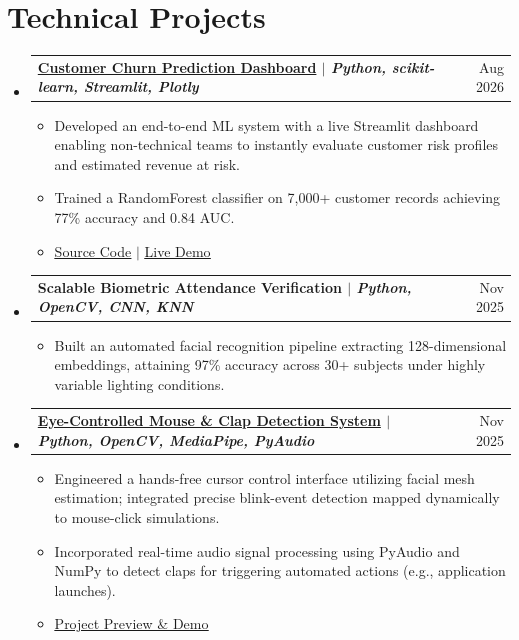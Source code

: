 \documentclass[10pt, a4paper]{article}
\makeatletter
\newcommand{\resumeItem}[1]{\item\small{#1}}
\newcommand{\resumeProjectHeading}[2]{
    \item
    \begin{tabular*}{0.97\textwidth}{l@{\extracolsep{\fill}}r}
      \small\textbf{#1} & #2 \\
    \end{tabular*}\vspace{-5pt}
}
\makeatother
\begin{document}
\section{Technical Projects}
    \begin{itemize}[leftmargin=0.15in, label={}]
      \resumeProjectHeading
          {\textbf{\href{https://lnkd.in/gGYd9A6t}{Customer Churn Prediction Dashboard}} $|$ \emph{Python, scikit-learn, Streamlit, Plotly}}{Aug 2026}
          \begin{itemize}[leftmargin=0.2in, label={\textbullet}]
            \resumeItem{Developed an end-to-end ML system with a live Streamlit dashboard enabling non-technical teams to instantly evaluate customer risk profiles and estimated revenue at risk.}
            \resumeItem{Trained a RandomForest classifier on 7,000+ customer records achieving 77\% accuracy and 0.84 AUC.}
            \resumeItem{\href{https://lnkd.in/gySTraXb}{\underline{Source Code}} $|$ \href{https://lnkd.in/gGYd9A6t}{\underline{Live Demo}}}
          \end{itemize}
      \vspace{3pt}
      \resumeProjectHeading
          {\textbf{Scalable Biometric Attendance Verification} $|$ \emph{Python, OpenCV, CNN, KNN}}{Nov 2025}
          \begin{itemize}[leftmargin=0.2in, label={\textbullet}]
            \resumeItem{Built an automated facial recognition pipeline extracting 128-dimensional embeddings, attaining 97\% accuracy across 30+ subjects under highly variable lighting conditions.}
          \end{itemize}
      \vspace{3pt}
      \resumeProjectHeading
          {\textbf{\href{https://www.linkedin.com/posts/ankan-puri-b01946292_computervision-machinelearning-python-activity-7218714892697006080-rsfc}{Eye-Controlled Mouse \& Clap Detection System}} $|$ \emph{Python, OpenCV, MediaPipe, PyAudio}}{Nov 2025}
          \begin{itemize}[leftmargin=0.2in, label={\textbullet}]
            \resumeItem{Engineered a hands-free cursor control interface utilizing facial mesh estimation; integrated precise blink-event detection mapped dynamically to mouse-click simulations.}
            \resumeItem{Incorporated real-time audio signal processing using PyAudio and NumPy to detect claps for triggering automated actions (e.g., application launches).}
            \resumeItem{\href{https://www.linkedin.com/posts/ankan-puri-b01946292_computervision-machinelearning-python-activity-7218714892697006080-rsfc}{\underline{Project Preview \& Demo}}}
          \end{itemize}
    \end{itemize}
\end{document}
